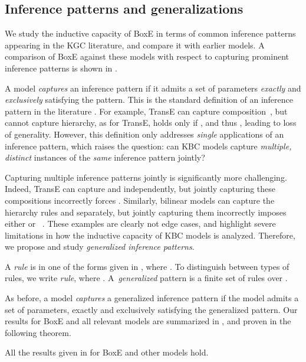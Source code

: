 \documentclass{article}
\begin{document}
\subsection{Inference patterns and generalizations}  
We study the inductive capacity of BoxE in terms of common inference patterns appearing in the  KGC literature, and compare it with earlier models. A comparison of BoxE against these models with respect to capturing prominent inference patterns is shown in .


A model \emph{captures} an inference pattern if it admits a set of parameters \emph{exactly} and \emph{exclusively} satisfying the pattern. This is the standard definition of an inference pattern in the literature \cite{RotatE-ICLR19}.
For example, TransE can capture composition~\cite{TransE-NIPS13,RotatE-ICLR19}, but cannot capture hierarchy, as for TransE,   holds only if , and thus , leading to loss of generality. However, this definition only addresses \emph{single} applications of an inference pattern, which raises the question: can KBC models capture \emph{multiple, distinct} instances of the \emph{same} inference pattern jointly? 

Capturing multiple inference patterns jointly is significantly more challenging. Indeed, TransE can capture  and  independently, but jointly capturing these compositions incorrectly forces . Similarly, bilinear models can capture the hierarchy rules  and  separately, but jointly capturing them incorrectly imposes either  or ~\cite{Gutirrez18}. These examples are clearly not edge cases, and highlight severe limitations in how the inductive capacity of KBC models is analyzed. Therefore, we propose and study \emph{generalized inference patterns}.

\begin{definition}
\label{def:gip}
A \emph{rule} is in one of the forms given in , where .
To distinguish between types of rules, we write \emph{ rule}, where .
A~\emph{generalized } pattern is a finite set of  rules over . 
\end{definition}

As before, a model \emph{captures} a generalized inference pattern if the model admits a set of parameters, exactly and exclusively satisfying the generalized pattern. Our results for BoxE and all relevant models are summarized in , and proven in the following theorem. \begin{theorem}
\label{thm:genPat}
All the results given in  for BoxE and other models hold.
\end{theorem}
\end{document}
